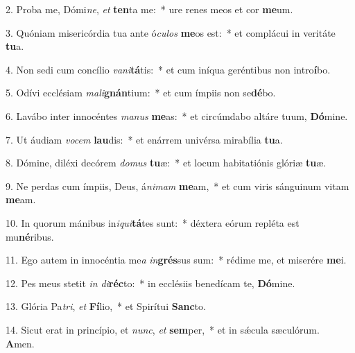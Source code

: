 2. Proba me, Dómi\textit{ne}, \textit{et} \textbf{ten}ta me:~*  ure renes meos et cor \textbf{me}um.\

3. Quóniam misericórdia tua ante ó\textit{cu}\textit{los} \textbf{me}os est:~*  et complácui in veritáte \textbf{tu}a.\

4. Non sedi cum concílio \textit{va}\textit{ni}\textbf{tá}tis:~*  et cum iníqua geréntibus non intro\textbf{í}bo.\

5. Odívi ecclésiam \textit{ma}\textit{li}\textbf{gnán}tium:~*  et cum ímpiis non se\textbf{dé}bo.\

6. Lavábo inter innocéntes \textit{ma}\textit{nus} \textbf{me}as:~*  et circúmdabo altáre tuum, \textbf{Dó}mine.\

7. Ut áudiam \textit{vo}\textit{cem} \textbf{lau}dis:~*  et enárrem univérsa mirabília \textbf{tu}a.\

8. Dómine, diléxi decórem \textit{do}\textit{mus} \textbf{tu}æ:~*  et locum habitatiónis glóriæ \textbf{tu}æ.\

9. Ne perdas cum ímpiis, Deus, á\textit{ni}\textit{mam} \textbf{me}am,~*  et cum viris sánguinum vitam \textbf{me}am.\

10. In quorum mánibus in\textit{i}\textit{qui}\textbf{tá}tes sunt:~*  déxtera eórum repléta est mu\textbf{né}ribus.\

11. Ego autem in innocéntia me\textit{a} \textit{in}\textbf{grés}sus sum:~*  rédime me, et miserére \textbf{me}i.\

12. Pes meus stetit \textit{in} \textit{di}\textbf{réc}to:~*  in ecclésiis benedícam te, \textbf{Dó}mine.\

13. Glória Pa\textit{tri}, \textit{et} \textbf{Fí}lio,~*  et Spirítui \textbf{Sanc}to.\

14. Sicut erat in princípio, et \textit{nunc}, \textit{et} \textbf{sem}per,~*  et in sǽcula sæculórum. \textbf{A}men.\


